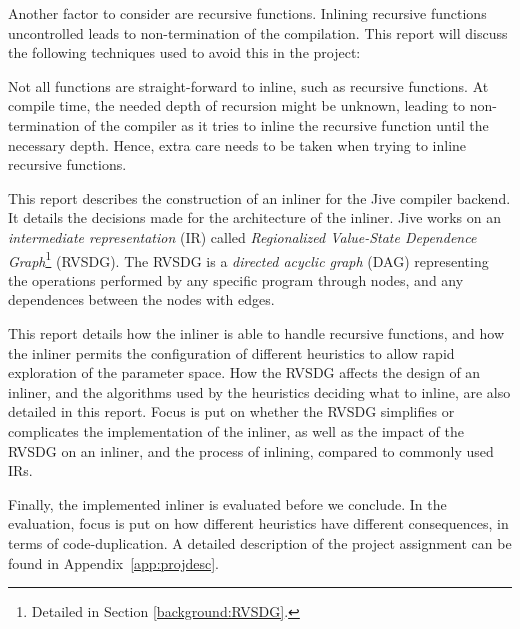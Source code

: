 Another factor to consider are recursive functions. Inlining recursive functions
uncontrolled leads to non-termination of the compilation. This report will
discuss the following techniques used to avoid this in the project:

Not all functions are straight-forward to inline, such as recursive functions.
At compile time, the needed depth of recursion might be unknown, leading to
non-termination of the compiler as it tries to inline the recursive function
until the necessary depth. Hence, extra care needs to be taken when trying to
inline recursive functions.

This report describes the construction of an inliner for the Jive compiler
backend. It details the decisions made for the architecture of the inliner. Jive
works on an \textit{intermediate representation} (IR) called
\textit{Regionalized Value-State Dependence Graph}\footnote{Detailed in Section
\ref{background:RVSDG}.} (RVSDG). The RVSDG is a \textit{directed acyclic graph}
(DAG) representing the operations performed by any specific program through
nodes, and any dependences between the nodes with edges.


This report details how the inliner is able to handle recursive functions, and
how the inliner permits the configuration of different heuristics to allow rapid
exploration of the parameter space. How the RVSDG affects the design of an
inliner, and the algorithms used by the heuristics deciding what to inline, are
also detailed in this report. Focus is put on whether the RVSDG simplifies or
complicates the implementation of the inliner, as well as the impact of the
RVSDG on an inliner, and the process of inlining, compared to commonly used IRs.

Finally, the implemented inliner is evaluated before we conclude. In the
evaluation, focus is put on how different heuristics have different
consequences, in terms of code-duplication. A detailed description of the
project assignment can be found in Appendix~\ref{app:projdesc}.

